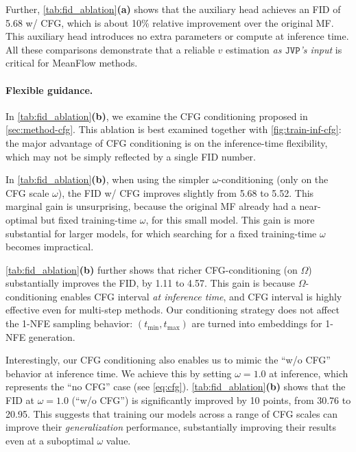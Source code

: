 Further, \cref{tab:fid_ablation}\textbf{(a)} shows that the auxiliary head achieves an FID of 5.68 w/ CFG, which is about 10\% relative improvement over the original MF.
This auxiliary head introduces no extra parameters or compute at inference time.
All these comparisons demonstrate that a reliable $v$ estimation \textit{as $\mathtt{JVP}$'s input} is critical for MeanFlow methods.


\paragraph{Flexible guidance.}
In \cref{tab:fid_ablation}\textbf{(b)}, we examine the CFG conditioning proposed in \cref{sec:method-cfg}. This ablation is best examined together with \cref{fig:train-inf-cfg}: the major advantage of CFG conditioning is on the inference-time flexibility, which may not be simply reflected by a single FID number.

In \cref{tab:fid_ablation}\textbf{(b)}, when using the simpler $\omega$-conditioning (\ie only on the CFG scale $\omega$), the FID w/ CFG improves slightly from 5.68 to 5.52. This marginal gain is unsurprising, because the original MF \cite{mf} already had a near-optimal but fixed training-time  $\omega$, for this small model. This gain is more substantial for larger models, for which searching for a fixed training-time $\omega$ becomes impractical.

\cref{tab:fid_ablation}\textbf{(b)} further shows that richer CFG-conditioning (\ie on $\Omega$) substantially improves the FID, by 1.11 to 4.57. This gain is because $\Omega$-conditioning enables CFG interval \cite{interval} \textit{at inference time}, and CFG interval is highly effective even for multi-step methods. 
Our conditioning strategy does not affect the 1-NFE sampling behavior: $(t_\textrm{min}, t_\textrm{max})$ are turned into embeddings for 1-NFE generation.

Interestingly, our CFG conditioning also enables us to mimic the ``w/o CFG'' behavior at inference time. We achieve this by setting $\omega=1.0$ at inference, which represents the ``no CFG'' case (see \cref{eq:cfg}). \cref{tab:fid_ablation}\textbf{(b)} shows that the FID at $\omega=1.0$ (``w/o CFG'') is significantly improved by 10 points, from 30.76 to 20.95. This suggests that training our models across a range of CFG scales can improve their \textit{generalization} performance, substantially improving their results even at a suboptimal $\omega$ value.



